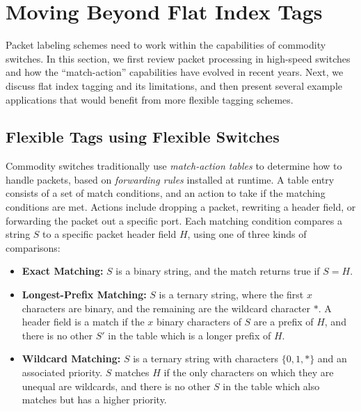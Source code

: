 \section{Moving Beyond Flat Index Tags}
\label{sec:background}


Packet labeling schemes need to work within the capabilities of commodity switches.  In this section, we first review packet processing in high-speed switches and how the ``match-action'' capabilities have evolved in recent years.  Next, we discuss flat index tagging and its limitations, and then present several example applications that would benefit from more flexible tagging schemes.

\subsection{Flexible Tags using Flexible Switches}
Commodity switches traditionally use \emph{match-action tables} to determine how to handle packets, based on \textit{forwarding rules} installed at runtime. A table entry consists of a set of match conditions, and an action to take if the matching conditions are met. Actions include dropping a packet, rewriting a header field, or forwarding the packet out a specific port. 
Each matching condition compares a string $S$ to a specific packet header field $H$, using one of three kinds of comparisons:

\begin{itemize}
  \item \textbf{Exact Matching:} $S$ is a binary string, and the match returns true if $S = H$.
  \item \textbf{Longest-Prefix Matching:} $S$ is a ternary string, where the first $x$ characters are binary, and the remaining are the wildcard character $*$. A header field is a match if the $x$ binary characters of $S$ are a prefix of $H$, and there is no other $S'$ in the table which is a longer prefix of $H$. 
  \item \textbf{Wildcard Matching:} $S$ is a ternary string with characters $\{0,1,*\}$ and an associated priority. $S$ matches $H$ if the only characters on which they are unequal are wildcards, and there is no other $S$ in the table which also matches but has a higher priority.
\end{itemize}
  
